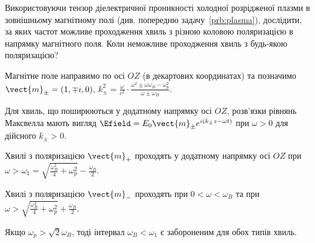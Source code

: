 \begin{problem}
    Використовуючи тензор діелектричної проникності холодної розрідженої плазми в зовнішньому магнітному полі (див.  попередню задачу~\ref{prb:plasma}), дослідити, за яких частот можливе проходження хвиль з різною коловою поляризацією в напрямку магнітного поля. Коли неможливе проходження хвиль з будь-якою поляризацією?
\begin{solution}
    Магнітне поле направимо по осі $OZ$ (в декартових координатах) та позначимо \(\vect{m}_{\pm} = (1, \mp i,0)\), \(k_\pm^2 = \frac{\omega }{c^2} \cdot \frac{\omega^2 \pm \omega \omega_B - \omega_p^2}{\omega  \pm \omega_B}\).

    Для хвиль, що поширюються у додатному напрямку осі $OZ$, розв’язки рівнянь Максвелла мають вигляд $\Efield = E_0\vect{m}_{\pm} e^{i(k_\pm z - \omega t)}$ при $\omega > 0$ для дійсного $k_{\pm} >0$.

    Хвилі з поляризацією $\vect{m}_+$ проходять у додатному напрямку осі $OZ$ при \(\omega  > \omega_1 = \sqrt {\frac{{\omega_B^2}}{4} + \omega_p^2}  - \frac{\omega _B}{2}\).

    Хвилі з поляризацією $\vect{m}_-$ проходять при \(0<\omega<\omega_B\)  та при\\\(\omega  > \sqrt {\frac{\omega_B^2}{4} + \omega_p^2}  + \frac{\omega _B}{2}\).

    Якщо \({\omega _p} > \sqrt 2 {\omega _B}\), тоді  інтервал \(\omega_B  <  \omega_1 \)  є забороненим для обох типів хвиль.
\end{solution}
\end{problem}

